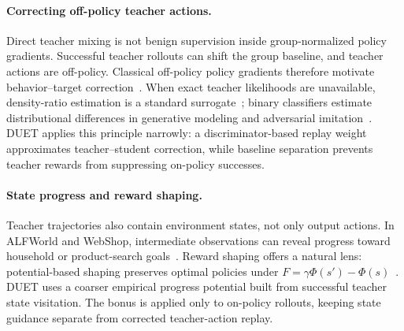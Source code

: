 \paragraph{Correcting off-policy teacher actions.}
Direct teacher mixing is not benign supervision inside group-normalized policy gradients. Successful teacher rollouts can shift the group baseline, and teacher actions are off-policy. Classical off-policy policy gradients therefore motivate behavior--target correction~\citep{degris2012offpolicy}. When exact teacher likelihoods are unavailable, density-ratio estimation is a standard surrogate~\citep{sugiyama2012density}; binary classifiers estimate distributional differences in generative modeling and adversarial imitation~\citep{goodfellow2014generative,ho2016gail}. DUET applies this principle narrowly: a discriminator-based replay weight approximates teacher--student correction, while baseline separation prevents teacher rewards from suppressing on-policy successes.

\paragraph{State progress and reward shaping.}
Teacher trajectories also contain environment states, not only output actions. In ALFWorld and WebShop, intermediate observations can reveal progress toward household or product-search goals~\citep{shridhar2020alfworld,yao2022webshop}. Reward shaping offers a natural lens: potential-based shaping preserves optimal policies under $F=\gamma\Phi(s')-\Phi(s)$~\citep{ng1999policy}. DUET uses a coarser empirical progress potential built from successful teacher state visitation. The bonus is applied only to on-policy rollouts, keeping state guidance separate from corrected teacher-action replay.
